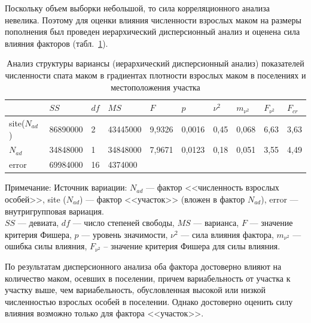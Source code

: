 Поскольку объем выборки небольшой, то сила корреляционного анализа невелика. 
Поэтому для оценки влияния численности взрослых маком на размеры пополнения был проведен иерархический дисперсионный анализ и оценена сила влияния факторов (табл.~\ref{tab:ANOVA_site_Nad_spat}).
\begin{table}[h]
\caption{Анализ структуры вариансы (иерархический дисперсионный анализ) показателей численности спата маком в градиентах плотности взрослых маком в поселениях и местоположения участка}
\label{tab:ANOVA_site_Nad_spat}
\begin{center}
\begin{tabular}{|l|lll|ll|ll|ll|}
\hline
                & $SS$        & $df$ & $MS$       & $F$      & $p$        & $\nu^2$      & $m_{\nu^2}$       & $F_{\nu^2}$            & $F_{cr}$  \\ \hline
  site($N_{ad}$) & 86890000  & 2  & 43445000 & 9,9326 & 0,0016 & 0,45 & 0,068 & 6,63 & 3,63 \\
$N_{ad}$         & 34848000  & 1  & 34848000 & 7,9671 & 0,0123 & 0,18 & 0,051 & 3,55 & 4,49 \\
error       & 69984000  & 16 & 4374000  &        &          &              &              &              &      \\ \hline
\end{tabular}
\end{center}

\footnotesize{Примечание: Источник вариации: $N_{ad}$ --- фактор <<численность взрослых особей>>, 
site ($N_{ad}$) --- фактор <<участок>> (вложен в фактор $N_{ad}$),
error ---  внутригрупповая вариация. \\
$SS$ --- девиата, 
$df$ --- число степеней свободы, 
$MS$ --- варианса, 
$F$ --- значение критерия Фишера, 
$p$  --- уровень значимости,
$\nu^2$ --- сила влияния фактора,
$m_{\nu^2}$ --- ошибка силы влияния,
$F_{\nu^2}$ – значение критерия Фишера для силы влияния.}
\end{table}
По результатам дисперсионного анализа оба фактора достоверно влияют на количество маком, осевших в поселении, причем вариабельность от участка к участку выше, чем вариабельность, обусловленная высокой или низкой численностью взрослых особей в поселении. 
Однако достоверно оценить силу влияния возможно только для фактора <<участок>>.

